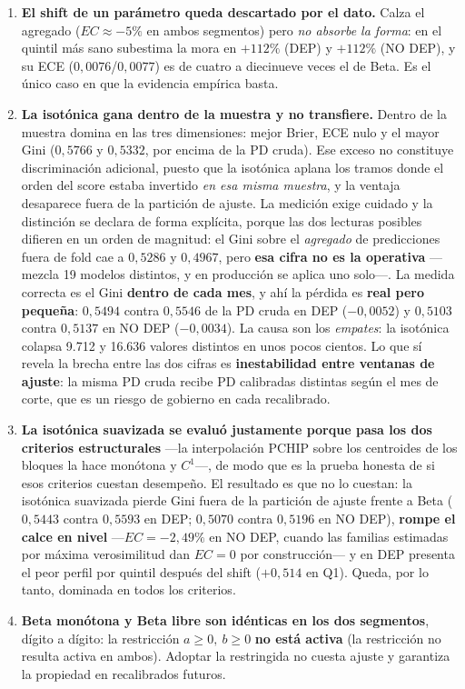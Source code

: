 \documentclass[12pt, a4paper]{article}
\begin{document}
\begin{enumerate}[nosep]
  \item \textbf{El shift de un parámetro queda descartado por el dato.} Calza el agregado
    ($EC\approx-5\%$ en ambos segmentos) pero \emph{no absorbe la forma}: en el quintil más sano
    subestima la mora en $+112\%$ (DEP) y $+112\%$ (NO DEP), y su ECE ($0{,}0076$/$0{,}0077$) es de
    cuatro a diecinueve veces el de Beta. Es el único caso en que la evidencia empírica basta.
  \item \textbf{La isotónica gana dentro de la muestra y no transfiere.} Dentro de la muestra
    domina en las tres dimensiones: mejor Brier, ECE nulo y el mayor Gini ($0{,}5766$ y $0{,}5332$,
    por encima de la PD cruda). Ese exceso no constituye discriminación adicional, puesto que la
    isotónica aplana los tramos donde el orden del score estaba invertido \emph{en esa misma
    muestra}, y la ventaja desaparece fuera de la partición de ajuste. La medición exige cuidado y
    la distinción se declara de forma explícita, porque las dos lecturas posibles difieren en un
    orden de magnitud: el Gini sobre el \emph{agregado} de predicciones fuera de fold cae a $0{,}5286$ y
    $0{,}4967$, pero \textbf{esa cifra no es la operativa} ---mezcla 19 modelos distintos, y en
    producción se aplica uno solo---. La medida correcta es el Gini \textbf{dentro de cada mes},
    y ahí la pérdida es \textbf{real pero pequeña}: $0{,}5494$ contra $0{,}5546$ de la PD cruda en
    DEP ($-0{,}0052$) y $0{,}5103$ contra $0{,}5137$ en NO DEP ($-0{,}0034$). La causa son los
    \emph{empates}: la isotónica colapsa 9.712 y 16.636 valores distintos en unos pocos cientos.
    Lo que sí revela la brecha entre las dos cifras es \textbf{inestabilidad entre ventanas de
    ajuste}: la misma PD cruda recibe PD calibradas distintas según el mes de corte, que es un
    riesgo de gobierno en cada recalibrado.
  \item \textbf{La isotónica suavizada se evaluó justamente porque pasa los dos criterios
    estructurales} ---la interpolación PCHIP sobre los centroides de los bloques la hace monótona
    y $C^1$---, de modo que es la prueba honesta de si esos criterios cuestan desempeño. El resultado
    es que no lo cuestan: la isotónica suavizada pierde Gini fuera de la partición de ajuste frente
    a Beta ($0{,}5443$ contra $0{,}5593$ en DEP; $0{,}5070$ contra $0{,}5196$ en NO DEP),
    \textbf{rompe el calce en nivel} ---$EC=-2{,}49\%$ en NO DEP, cuando las familias estimadas por
    máxima verosimilitud dan $EC=0$ por construcción--- y en DEP presenta el peor perfil por quintil
    después del shift ($+0{,}514$ en Q1). Queda, por lo tanto, dominada en todos los criterios.
  \item \textbf{Beta monótona y Beta libre son idénticas en los dos segmentos}, dígito a dígito:
    la restricción $a\ge0,\ b\ge0$ \textbf{no está activa}
    (la restricción no resulta activa en ambos). Adoptar la restringida no
    cuesta ajuste y garantiza la propiedad en recalibrados futuros.
\end{enumerate}
\end{document}
